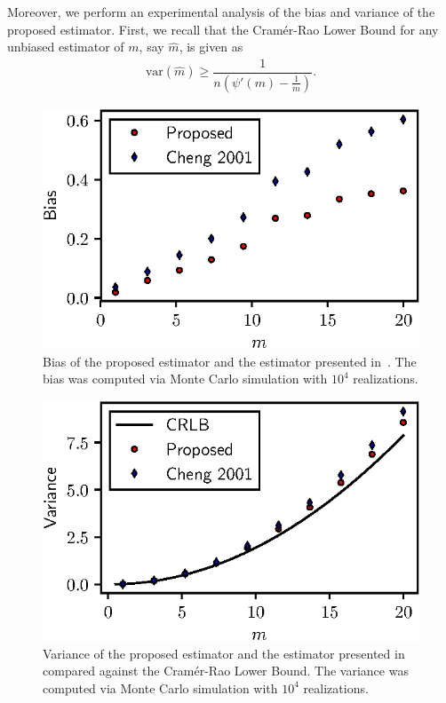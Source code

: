 \documentclass[conference, 10pt]{IEEEtran}
\begin{document}
Moreover, we perform an experimental analysis of the bias and variance of the proposed estimator.
First, we recall that the Cram\'er-Rao Lower Bound for any unbiased estimator of $m$, say $\hat{m}$,
is given as~\cite{cheng2001}
\begin{align}
    \mathrm{var}(\hat{m}) \geq \dfrac{1}{n\left(\psi'(m) - \frac{1}{m}\right)}.
\end{align}


\begin{figure}[!htb]
    \centering
    \includegraphics{figures/bias_N100.eps}
    \caption{Bias of the proposed estimator and the estimator presented in~\cite{cheng2001}.
             The bias was computed via Monte Carlo simulation with $10^4$ realizations.}
    \label{fig:bias}
\end{figure}

\begin{figure}[!htb]
    \centering
    \includegraphics{figures/variance_N100.eps}
    \caption{Variance of the proposed estimator and the estimator presented in~\cite{cheng2001}
             compared against the Cram\'er-Rao Lower Bound. The variance was computed via
             Monte Carlo simulation with $10^4$ realizations.}
    \label{fig:variance}
\end{figure}
\end{document}
